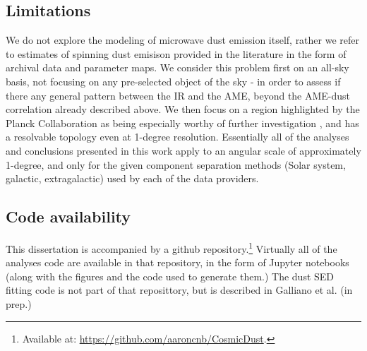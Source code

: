   \subsection{Limitations}
    We do not explore the modeling of microwave dust emission itself, rather we refer to estimates of spinning dust emisison provided in the literature \citep{planckXII, wmap03b} in the form of archival data and parameter maps. We consider this problem first on an all-sky basis, not focusing on any pre-selected object of the sky - in order to assess if there any general pattern between the IR and the AME, beyond the AME-dust correlation already described above. We then focus on a region highlighted by the Planck Collaboration as being especially worthy of further investigation \citep{planck15X}, and has a resolvable topology even at 1-degree resolution. Essentially all of the analyses and conclusions presented in this work apply to an angular scale of approximately 1-degree, and only for the given component separation methods (Solar system, galactic, extragalactic) used by each of the data providers.

  \subsection{Code availability}
    This dissertation is accompanied by a github repository.\footnote{Available at: \url{https://github.com/aaroncnb/CosmicDust}.} Virtually all of the analyses code are available in that repository, in the form of Jupyter notebooks (along with the figures and the code used to generate them.) The dust SED fitting code is not part of that reposittory, but is described in Galliano et al. (in prep.)
